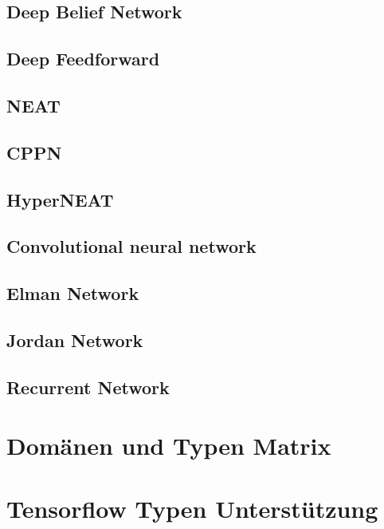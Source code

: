 \subsection{Deep Belief Network}

\subsection{Deep Feedforward}
\label{subsec:Deep Feedforward}

\subsection{NEAT}

\subsection{CPPN}

\subsection{HyperNEAT}

\subsection{Convolutional neural network}

\subsection{Elman Network}

\subsection{Jordan Network}

\subsection{Recurrent Network}

\section{Domänen und Typen Matrix}

\section{Tensorflow Typen Unterstützung}
